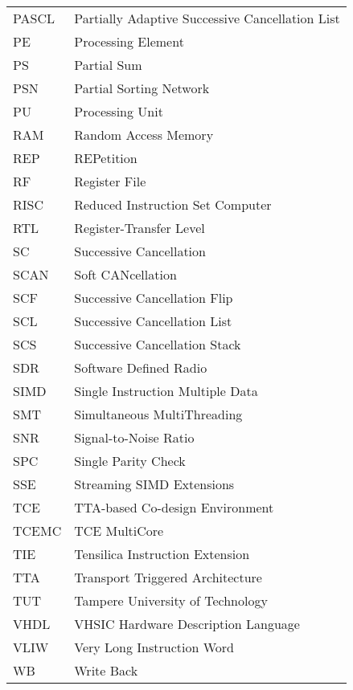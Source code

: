\begin{center}
\begin{longtable}{ p{}  p{} }
PASCL     & Partially Adaptive Successive Cancellation List        \\
PE        & Processing Element                                     \\
PS        & Partial Sum                                            \\
PSN       & Partial Sorting Network                                \\
PU        & Processing Unit                                        \\
RAM       & Random Access Memory                                   \\
REP       & REPetition                                             \\
RF        & Register File                                          \\
RISC      & Reduced Instruction Set Computer                       \\
RTL       & Register-Transfer Level                                \\
SC        & Successive Cancellation                                \\
SCAN      & Soft CANcellation                                      \\
SCF       & Successive Cancellation Flip                           \\
SCL       & Successive Cancellation List                           \\
SCS       & Successive Cancellation Stack                          \\
SDR       & Software Defined Radio                                 \\
SIMD      & Single Instruction Multiple Data                       \\
SMT       & Simultaneous MultiThreading                            \\
SNR       & Signal-to-Noise Ratio                                  \\
SPC       & Single Parity Check                                    \\
SSE       & Streaming SIMD Extensions                              \\
TCE       & TTA-based Co-design Environment                        \\
TCEMC     & TCE MultiCore                                          \\
TIE       & Tensilica Instruction Extension                        \\
TTA       & Transport Triggered Architecture                       \\
TUT       & Tampere University of Technology                       \\
VHDL      & VHSIC Hardware Description Language                    \\
VLIW      & Very Long Instruction Word                             \\
WB        & Write Back                                             \\
\end{longtable}

\end{center}


